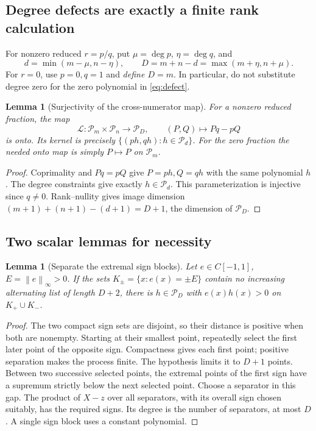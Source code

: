 \documentclass[11pt]{article}
\newcommand{\PP}{\mathcal P}
\newcommand{\norm}[1]{\left\lVert#1\right\rVert}
\newtheorem{lemma}[theorem]{Lemma}
\theoremstyle{remark}\newtheorem{remark}[theorem]{Remark}
\begin{document}
\subsection{Degree defects are exactly a finite rank calculation}
For nonzero reduced $r=p/q$, put $\mu=\deg p$, $\eta=\deg q$, and
\begin{equation}\label{eq:defect}
 d=\min(m-\mu,n-\eta),\qquad
 D=m+n-d=\max(m+\eta,n+\mu).
\end{equation}
For $r=0$, use $p=0,q=1$ and \emph{define $D=m$}. In particular, do not
substitute degree zero for the zero polynomial in \eqref{eq:defect}.

\begin{lemma}[Surjectivity of the cross-numerator map]\label{lem:rank}
For a nonzero reduced fraction, the map
\[
 \mathcal L:\PP_m\times\PP_n\longrightarrow\PP_D,
 \qquad (P,Q)\longmapsto Pq-pQ
\]
is onto. Its kernel is precisely $\{(ph,qh):h\in\PP_d\}$.
For the zero fraction the needed onto map is simply $P\mapsto P$ on $\PP_m$.
\end{lemma}
\begin{proof}
Coprimality and $Pq=pQ$ give $P=ph,Q=qh$ with the same polynomial $h$.
The degree constraints give exactly $h\in\PP_d$. This parameterization is
injective since $q\ne0$. Rank--nullity gives image dimension
$(m+1)+(n+1)-(d+1)=D+1$, the dimension of $\PP_D$.
\end{proof}

\subsection{Two scalar lemmas for necessity}
\begin{lemma}[Separate the extremal sign blocks]\label{lem:signs}
Let $e\in C[-1,1]$, $E=\norm e_\infty>0$. If the sets
$K_\pm=\{x:e(x)=\pm E\}$ contain no increasing alternating list of length
$D+2$, there is $h\in\PP_D$ with $e(x)h(x)>0$ on $K_+\cup K_-$.
\end{lemma}
\begin{proof}
The two compact sign sets are disjoint, so their distance is positive when
both are nonempty. Starting at their smallest point, repeatedly select the
first later point of the opposite sign. Compactness gives each first point;
positive separation makes the process finite. The hypothesis limits it to
$D+1$ points. Between two successive selected points, the extremal points
of the first sign have a supremum strictly below the next selected point.
Choose a separator in this gap. The product of $X-z$ over all separators,
with its overall sign chosen suitably, has the required signs. Its degree
is the number of separators, at most $D$. A single sign block uses a
constant polynomial.
\end{proof}
\end{document}
